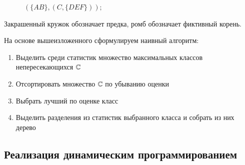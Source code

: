 \begin{example}
\begin{figure}[H]
      \caption{$(\{AB\}, (C, \{DEF\}));$}
    \endminipage
  \end{figure}
  Закрашенный кружок обозначает предка, ромб обозначает фиктивный корень.
\end{example}


На основе вышеизложенного сформулируем наивный алгоритм:
\begin{enumerate}
  \item Выделить среди статистик множество максимальных классов непересекающихся $\mathbb{C}$
  \item Отсортировать множество $\mathbb{C}$ по убыванию оценки
  \item Выбрать лучший по оценке класс
  \item Выделить разделения из статистик выбранного класса и собрать из них дерево
\end{enumerate}

\subsection{Реализация динамическим программированием}

